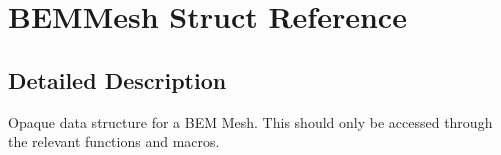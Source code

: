\section{BEMMesh Struct Reference}
\label{structBEMMesh}


\subsection{Detailed Description}
Opaque data structure for a BEM Mesh. This should only be accessed through the relevant functions and macros. 

